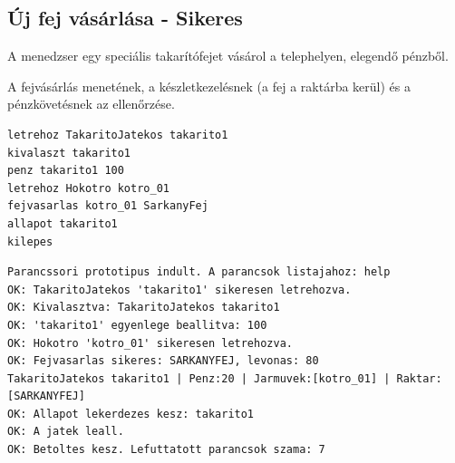 \subsection{Új fej vásárlása - Sikeres}
\begin{test-case-description}
    A menedzser egy speciális takarítófejet vásárol a telephelyen, elegendő pénzből.
\end{test-case-description}
\begin{test-case-function}
    A fejvásárlás menetének, a készletkezelésnek (a fej a raktárba kerül) és a pénzkövetésnek az ellenőrzése.
\end{test-case-function}
\begin{test-case-input}
\begin{verbatim}
letrehoz TakaritoJatekos takarito1
kivalaszt takarito1
penz takarito1 100
letrehoz Hokotro kotro_01
fejvasarlas kotro_01 SarkanyFej
allapot takarito1
kilepes
\end{verbatim}
\end{test-case-input}
\begin{test-case-output}
\begin{verbatim}
Parancssori prototipus indult. A parancsok listajahoz: help
OK: TakaritoJatekos 'takarito1' sikeresen letrehozva.
OK: Kivalasztva: TakaritoJatekos takarito1
OK: 'takarito1' egyenlege beallitva: 100
OK: Hokotro 'kotro_01' sikeresen letrehozva.
OK: Fejvasarlas sikeres: SARKANYFEJ, levonas: 80
TakaritoJatekos takarito1 | Penz:20 | Jarmuvek:[kotro_01] | Raktar:[SARKANYFEJ]
OK: Allapot lekerdezes kesz: takarito1
OK: A jatek leall.
OK: Betoltes kesz. Lefuttatott parancsok szama: 7
\end{verbatim}
\end{test-case-output}

